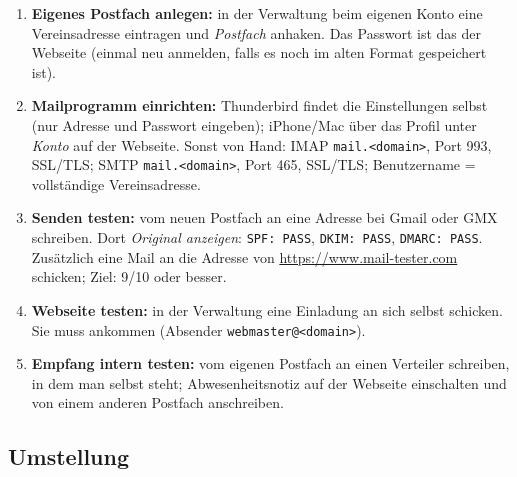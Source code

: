 \documentclass[a4paper,fontsize=10pt]{scrartcl}
\newcommand*{\cmd}[1]{\texttt{#1}}
\newcommand*{\erledigt}{\makebox[1.4em][l]{\setlength{\fboxsep}{0pt}\fbox{\rule{0pt}{0.7em}\hspace{0.7em}}}}
\begin{document}
\begin{enumerate}[resume]
  \item \erledigt\textbf{Eigenes Postfach anlegen:} in der Verwaltung beim eigenen Konto
        eine Vereinsadresse eintragen und \emph{Postfach} anhaken. Das Passwort ist das
        der Webseite (einmal neu anmelden, falls es noch im alten Format gespeichert
        ist).
  \item \erledigt\textbf{Mailprogramm einrichten:} Thunderbird findet die Einstellungen
        selbst (nur Adresse und Passwort eingeben); iPhone/Mac über das Profil unter
        \emph{Konto} auf der Webseite. Sonst von Hand: IMAP
        \cmd{mail.<domain>}, Port 993, SSL/TLS; SMTP \cmd{mail.<domain>}, Port 465,
        SSL/TLS; Benutzername = vollständige Vereinsadresse.
  \item \erledigt\textbf{Senden testen:} vom neuen Postfach an eine Adresse bei Gmail oder
        GMX schreiben. Dort \emph{Original anzeigen}: \cmd{SPF: PASS}, \cmd{DKIM: PASS},
        \cmd{DMARC: PASS}. Zusätzlich eine Mail an die Adresse von
        \url{https://www.mail-tester.com} schicken; Ziel: 9/10 oder besser.
  \item \erledigt\textbf{Webseite testen:} in der Verwaltung eine Einladung an sich selbst
        schicken. Sie muss ankommen (Absender \cmd{webmaster@<domain>}).
  \item \erledigt\textbf{Empfang intern testen:} vom eigenen Postfach an einen Verteiler
        schreiben, in dem man selbst steht; Abwesenheitsnotiz auf der Webseite
        einschalten und von einem anderen Postfach anschreiben.
\end{enumerate}

\subsection{Umstellung}
\end{document}
